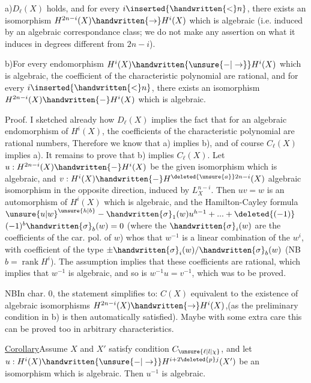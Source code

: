a)\quad $D_{\ell}(X)$ holds, and for every $i\inserted{\handwritten{<}n}$, there exists an isomorphism
$H^{2n-i}(X)\handwritten{\to}H^{i}(X)$ which is algebraic (i.e. induced by an algebraic correspondance
class; we do not make any assertion on what it induces in degrees
different from $2n-i$).

b)\quad For every endomorphism $H^{i}(X)\handwritten{\unsure{-|\to}}H^{i}(X)$ which is algebraic, the
coefficient of the characteristic polynomial are rational, and for every
$i\inserted{\handwritten{<}n}$, there exists an isomorphism $H^{2n-i}(X)\handwritten{-}H^{i}(X)$ which is algebraic.

Proof. I sketched already how $D_{\ell}(X)$ implies the fact that for an
algebraic endomorphism of $H^{i}(X)$, the coefficients of the characteristic
polynomial are rational numbers, Therefore we know that a) implies b),
and of course $C_{\ell}(X)$ implies a). It remains to prove that b) implies
$C_{\ell}(X)$. Let $u:H^{2n-i}(X)\handwritten{-}H^{i}(X)$ be the given isomorphism which is algebraic,
and $v:H^{i}(X)\handwritten{-}H^{\deleted{\unsure{a}}2n-i}(X)$  algebraic isomorphism in the opposite
direction, induced by $L_{X}^{n-i}$. Then $uv=w$ is an automorphism of $H^{i}(X)$ which
is algebraic, and the Hamilton-Cayley formula $\unsure{u|w}^{\unsure{h|b}}-\handwritten{\sigma}_{1}(w)u^{h-1}+\mathinner{...}+\deleted{(-1)}$
$(-1)^{b}\handwritten{\sigma}_{b}(w)=0$ (where the $\handwritten{\sigma}_{i}(w)$ are the coefficients of the car. pol.
of $w$) whos that $w^{-1}$ is a linear combination of the $w^{i}$, with coefficient
of the type $\pm\handwritten{\sigma}_{i}(w)/\handwritten{\sigma}_{b}(w)$ (NB $b=\operatorname{rank}H^{i}$). The assumption implies
that these coefficients are rational, which implies that $w^{-1}$ is algebraic,
and so is $w^{-1}u=v^{-1}$, which was to be proved.

NB\quad In char. $0$,  the statement simplifies to: $C(X)$ equivalent
to the existence of algebraic isomorphisms $H^{2n-i}(X)\handwritten{\to}H^{i}(X)$,(as the preliminary
condition in b) is then automatically satisfied). Maybe with some
extra care this can be proved too in arbitrary characteristics.

\uline{Corollary}\quad Assume $X$ and $X'$ satisfy condition $C_{\unsure{\ell|l|\chi}}$, and let
$u:H^{i}(X)\handwritten{\unsure{-|\to}}H^{i+2\deleted{p}j}(X')$  be an isomorphism which is algebraic. Then $u^{-1}$ is
algebraic.

